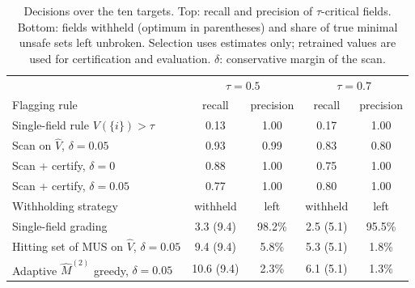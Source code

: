 \begin{table}[!tp]
\centering\small
\caption{Decisions over the ten targets. Top: recall and precision of $\tau$-critical fields. Bottom: fields withheld (optimum
in parentheses) and share of true minimal unsafe sets left unbroken. Selection uses estimates only; retrained values are used
for certification and evaluation. $\delta$: conservative margin of the scan.}\label{tab:decision}
\begin{tabular}{lcccc}
\toprule
 & \multicolumn{2}{c}{$\tau=0.5$} & \multicolumn{2}{c}{$\tau=0.7$}\\
Flagging rule & recall & precision & recall & precision\\
\midrule
Single-field rule $V(\{i\})>\tau$ & 0.13 & 1.00 & 0.17 & 1.00 \\
Scan on $\hat V$, $\delta=0.05$ & 0.93 & 0.99 & 0.83 & 0.80 \\
Scan + certify, $\delta=0$ & 0.88 & 1.00 & 0.75 & 1.00 \\
Scan + certify, $\delta=0.05$ & 0.77 & 1.00 & 0.80 & 1.00 \\
\midrule
Withholding strategy & withheld & left & withheld & left\\
\midrule
Single-field grading & 3.3 (9.4) & 98.2\% & 2.5 (5.1) & 95.5\% \\
Hitting set of MUS on $\hat V$, $\delta=0.05$ & 9.4 (9.4) & 5.8\% & 5.3 (5.1) & 1.8\% \\
Adaptive $\hat M^{(2)}$ greedy, $\delta=0.05$ & 10.6 (9.4) & 2.3\% & 6.1 (5.1) & 1.3\% \\
\bottomrule
\end{tabular}
\end{table}
